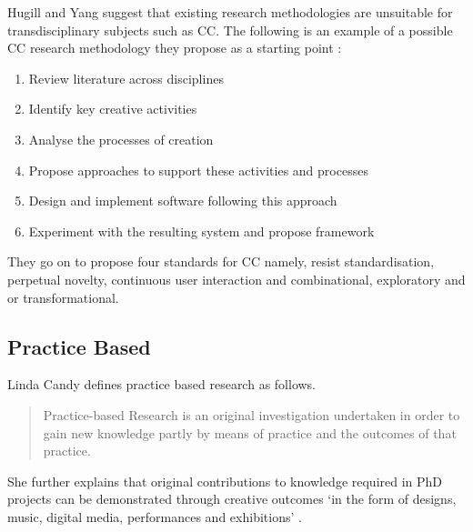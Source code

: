 \begin{draft}
  Hugill and Yang suggest that existing research methodologies are unsuitable for transdisciplinary subjects such as \ac{CC}. The following is an example of a possible \ac{CC} research methodology they propose as a starting point \autocite[p.17]{Hugill2013c}:

  \begin{enumerate}
    \item Review literature across disciplines
    \item Identify key creative activities
    \item Analyse the processes of creation
    \item Propose approaches to support these activities and processes
    \item Design and implement software following this approach
    \item Experiment with the resulting system and propose framework
  \end{enumerate}

  They go on to propose four standards for \ac{CC} \autocite[p.17]{Hugill2013c} namely, resist standardisation, perpetual novelty, continuous user interaction and combinational, exploratory and or transformational.
\end{draft}

\begin{draft}

\end{draft}

\subsection{Practice Based}

Linda Candy defines practice based research as follows.

\begin{quotation}
  Practice-based Research is an original investigation undertaken in order to gain new knowledge partly by means of practice and the outcomes of that practice. 
\end{quotation}

She further explains that original contributions to knowledge required in PhD projects can be demonstrated through creative outcomes `in the form of designs, music, digital media, performances and exhibitions' \autocite{Candy2006}.


